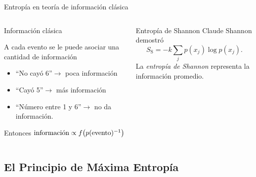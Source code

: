 \begin{frame}{Entropía en teoría de información clásica}
    \begin{columns}
        \begin{column}{0.5\textwidth}
            \begin{block}{Información clásica}
            \begin{center}
                A cada evento se le puede asociar una cantidad de información\pause
            \end{center}
            \begin{itemize}
                \item ``No cayó 6''$\rightarrow$ poca información\pause
                \item ``Cayó 5''$\rightarrow$ más información\pause
                \item ``Número entre 1 y 6''$\rightarrow$ no da información.
            \end{itemize}
            Entonces $\text{información}\propto f\qty(p(\text{evento})^{-1})$
        \end{block}
        \end{column}
        \pause
        \begin{column}{0.5\textwidth}
            \begin{block}{Entropía de Shannon}
            Claude Shannon demostró
            \begin{equation}
                S_{\text{S}}=-k\sum_{j}p(x_{j})\log{p(x_{j})}.\nonumber
            \end{equation}\pause
            La \textit{entropía de Shannon} representa la información promedio.
        \end{block}
        \end{column}
    \end{columns}
\end{frame}

\subsection{El Principio de Máxima Entropía}

